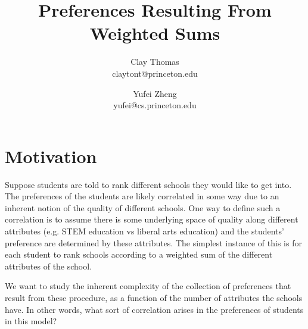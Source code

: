 \documentclass[12pt]{article}
\newcommand{\Rgz}{\mathbb{R}_{\ge 0}}
\newcommand{\1}[1]{\mathds{1}[{#1}]}
\begin{document}

\title{Preferences Resulting From Weighted Sums}
\author{
Clay Thomas\\
claytont@princeton.edu 
\and
Yufei Zheng\\
yufei@cs.princeton.edu
}

\maketitle

\section{Motivation}
  Suppose students are told to rank different schools they would like to
  get into. The preferences of the students are likely correlated in some
  way due to an inherent notion of the quality of different schools.
  One way to define such a correlation is to assume there is some underlying
  space of quality along different attributes (e.g. STEM education vs
  liberal arts education) and the students' preference
  are determined by these attributes.
  The simplest instance of this is for each student to rank schools
  according to a weighted sum of the different attributes of the school.

  We want to study the inherent complexity of the collection of preferences
  that result from these procedure, as a function of the number of attributes
  the schools have. In other words, what sort of correlation arises in the
  preferences of students in this model?


% 
% 
\end{document}
